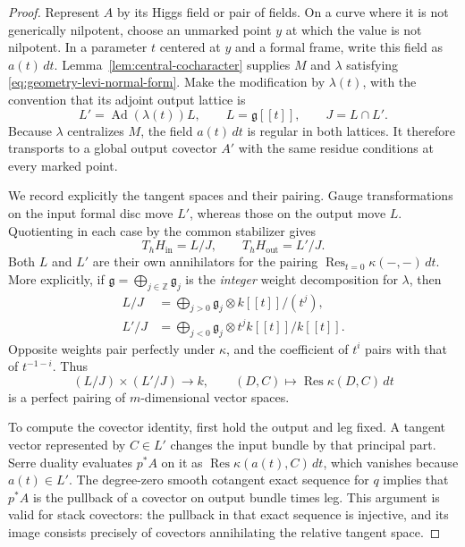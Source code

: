 \begin{proof}
Represent $A$ by its Higgs field or pair of fields.  On a curve where
it is not generically nilpotent, choose an unmarked point $y$ at which
the value is not nilpotent.  In a parameter $t$ centered at $y$ and a
formal frame, write this field as $a(t)\,dt$.
Lemma~\ref{lem:central-cocharacter} supplies $M$ and $\lambda$ satisfying
\eqref{eq:geometry-levi-normal-form}.  Make the modification by
$\lambda(t)$, with the convention that its adjoint output lattice is
\[
 L'=\operatorname{Ad}(\lambda(t))L,
 \qquad L=\mathfrak g[[t]],\qquad J=L\cap L'.
\]
Because $\lambda$ centralizes $M$, the field $a(t)\,dt$ is regular in
both lattices.  It therefore transports to a global output covector
$A'$ with the same residue conditions at every marked point.

We record explicitly the tangent spaces and their pairing.  Gauge
transformations on the input formal disc move $L'$, whereas those on the output
move $L$.  Quotienting in each case by the common stabilizer gives
\begin{equation}\label{eq:geometry-two-tangents}
 T_hH_{\mathrm{in}}=L/J,
 \qquad T_hH_{\mathrm{out}}=L'/J.
\end{equation}
Both $L$ and $L'$ are their own annihilators for the pairing
$\operatorname{Res}_{t=0}\kappa(-,-)\,dt$.  More explicitly, if
$\mathfrak g=\bigoplus_{j\in\mathbb Z}\mathfrak g_j$ is the
\emph{integer} weight decomposition for $\lambda$, then
\begin{equation}\label{eq:geometry-truncated-lattices}
 \begin{aligned}
 L/J&=\bigoplus_{j>0}
           \mathfrak g_j\otimes k[[t]]/(t^j),\\
 L'/J&=\bigoplus_{j<0}
           \mathfrak g_j\otimes t^jk[[t]]/k[[t]].
 \end{aligned}
\end{equation}
Opposite weights pair perfectly under $\kappa$, and the coefficient
of $t^i$ pairs with that of $t^{-1-i}$.  Thus
\begin{equation}\label{eq:geometry-residue-perfect}
 (L/J)\times(L'/J)\longrightarrow k,
 \qquad (D,C)\longmapsto\operatorname{Res}\kappa(D,C)\,dt
\end{equation}
is a perfect pairing of $m$-dimensional vector spaces.

To compute the covector identity, first hold the output and leg fixed.
A tangent vector represented by $C\in L'$ changes the input bundle
by that principal part.  Serre duality evaluates $p^*A$ on it as
$\operatorname{Res}\kappa(a(t),C)\,dt$, which vanishes because
$a(t)\in L'$.  The degree-zero smooth cotangent exact sequence for
$q$ implies that $p^*A$ is the pullback of a covector on output bundle
times leg.  This argument is valid for stack covectors: the pullback
in that exact sequence is injective, and its image consists precisely
of covectors annihilating the relative tangent space.


\end{proof}
